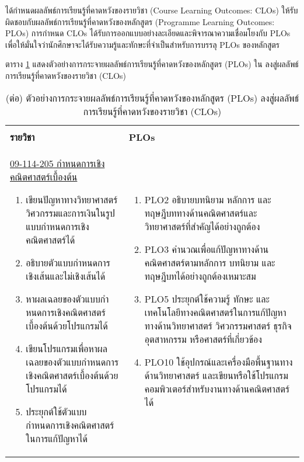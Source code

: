 
\printprogram{} ได้กำหนดผลลัพธ์การเรียนรู้ที่คาดหวังของรายวิชา (Course Learning Outcomes: CLOs) ให้รับผิดชอบกับผลลัพธ์การเรียนรู้ที่คาดหวังของหลักสูตร (Programme Learning Outcomes: PLOs) การกำหนด CLOs ได้รับการออกแบบอย่างละเอียดและพิจารณาความเชื่อมโยงกับ PLOs เพื่อให้มั่นใจว่านักศึกษาจะได้รับความรู้และทักษะที่จำเป็นสำหรับการบรรลุ PLOs ของหลักสูตร

ตาราง \ref{table: closvsplos} แสดงตัวอย่างการกระจายผลลัพธ์การเรียนรู้ที่คาดหวังของหลักสูตร (PLOs) ใน\printprogram{} ลงสู่ผลลัพธ์การเรียนรู้ที่คาดหวังของรายวิชา (CLOs)  

\begin{longtable}{|>{\raggedright}p{}|>{\raggedright\arraybackslash}p{}|}
\caption{ตัวอย่างการกระจายผลลัพธ์การเรียนรู้ที่คาดหวังของหลักสูตร (PLOs) ลงสู่ผลลัพธ์การเรียนรู้ที่คาดหวังของรายวิชา (CLOs)}
\label{table: closvsplos}
\\
\hline
\multicolumn{1}{|c|}{\textbf{CLOs}} & \multicolumn{1}{|c|}{\textbf{PLOs}} \\
\hline
\endfirsthead

\caption[]{(ต่อ) ตัวอย่างการกระจายผลลัพธ์การเรียนรู้ที่คาดหวังของหลักสูตร (PLOs) ลงสู่ผลลัพธ์การเรียนรู้ที่คาดหวังของรายวิชา (CLOs)}
\\
\hline
\textbf{รายวิชา} & \textbf{PLOs} \\
\hline
\endhead

\underline{09-114-205 กำหนดการเชิงคณิตศาสตร์เบื้องต้น} 
\begin{enumerate}[label={CLO\arabic*}]
\item เขียนปัญหาทางวิทยาศาสตร์ วิศวกรรมและการเงินในรูปแบบกําหนดการเชิงคณิตศาสตร์ได้  
\item อธิบายตัวแบบกําหนดการเชิงเส้นและไม่เชิงเส้นได้ 
\item หาผลเฉลยของตัวแบบกําหนดการเชิงคณิตศาสตร์เบื้องต้นด้วยโปรแกรมได้ 
\item เขียนโปรแกรมเพื่อหาผลเฉลยของตัวแบบกําหนดการเชิงคณิตศาสตร์เบื้องต้นด้วยโปรแกรมได้ 
\item ประยุกต์ใช้ตัวแบบกำหนดการเชิงคณิตศาสตร์ในการแก้ปัญหาได้             
\end{enumerate}

&

\begin{enumerate}[label={}]
	\item PLO2 อธิบายบทนิยาม หลักการ และทฤษฎีบททางด้านคณิตศาสตร์และวิทยาศาสตร์ที่สำคัญได้อย่างถูกต้อง
\item PLO3 คำนวณเพื่อแก้ปัญหาทางด้านคณิตศาสตร์ตามหลักการ บทนิยาม และทฤษฎีบทได้อย่างถูกต้องเหมาะสม
\item PLO5 ประยุกต์ใช้ความรู้ ทักษะ และเทคโนโลยีทางคณิตศาสตร์ในการแก้ปัญหาทางด้านวิทยาศาสตร์ วิศวกรรมศาสตร์ ธุรกิจ อุตสาหกรรม หรือศาสตร์ที่เกี่ยวข้อง
\item PLO10 ใช้อุปกรณ์และเครื่องมือพื้นฐานทางด้านวิทยาศาสตร์ และเขียนหรือใช้โปรแกรมคอมพิวเตอร์สำหรับงานทางด้านคณิตศาสตร์ได้
\end{enumerate}
\\
\hline


\end{longtable}
